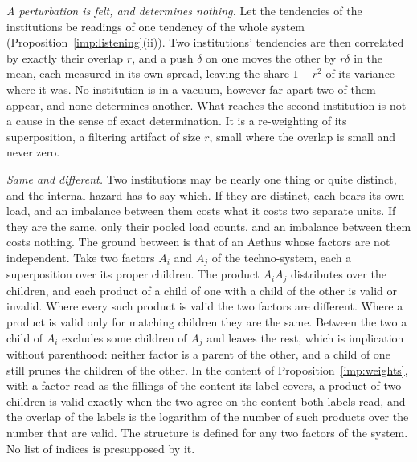 \emph{A perturbation is felt, and determines nothing.} Let the
tendencies of the institutions be readings of one tendency of the whole
system (Proposition~\ref{imp:listening}(ii)). Two institutions' tendencies are then correlated by
exactly their overlap $r$, and a push $\delta$ on one moves the other by
$r\delta$ in the mean, each measured in its own spread, leaving the share
$1-r^2$ of its variance where it was. No institution is in a vacuum,
however far apart two of them appear, and none determines another. What
reaches the second institution is not a cause in the sense of exact
determination. It is a re-weighting of its superposition, a filtering
artifact of size $r$, small where the overlap is small and never zero.


\emph{Same and different.} Two institutions may be nearly one thing or
quite distinct, and the internal hazard has to say which. If they are
distinct, each bears its own load, and an imbalance between them costs
what it costs two separate units. If they are the same, only their pooled
load counts, and an imbalance between them costs nothing. The ground
between is that of an Aethus whose factors are not independent. Take two
factors $A_i$ and $A_j$ of the techno-system, each a superposition over
its proper children. The product $A_iA_j$ distributes over the children,
and each product of a child of one with a child of the other is valid or
invalid. Where every such product is valid the two factors are different.
Where a product is valid only for matching children they are the same.
Between the two a child of $A_i$ excludes some children of $A_j$ and
leaves the rest, which is implication without parenthood: neither factor
is a parent of the other, and a child of one still prunes the children of
the other. In the content of Proposition~\ref{imp:weights}, with a factor read as the
fillings of the content its label covers, a product of two children is
valid exactly when the two agree on the content both labels read, and the
overlap of the labels is the logarithm of the number of such products
over the number that are valid. The structure is defined for any two
factors of the system. No list of indices is presupposed by it.

